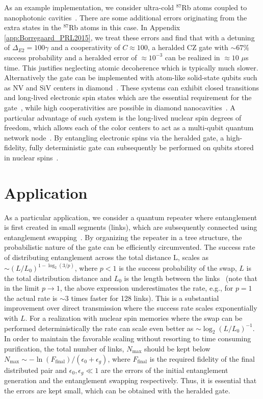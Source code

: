 As an example implementation, we consider ultra-cold ${}^{87}$Rb atoms coupled
to nanophotonic cavities~\cite{thompson,Tiecke}. There are some additional
errors originating from the extra states in the ${}^{87}$Rb atoms in this case.
In Appendix \ref{app:Borregaard_PRL2015}, we treat these errors and find that with a detuning of
$\Delta_{E2}=100\gamma$ and a cooperativity of $C\approx100$, a heralded CZ gate
with $\sim67\%$ success probability and a heralded error of $\approx 10^{-3}$
can be realized in $\approx10$ $\mu$s time. This justifies neglecting atomic
decoherence which is typically much slower.
Alternatively the gate can be implemented with atom-like solid-state qubits such
as NV and SiV centers in diamond~\cite{phystoday}. These systems can exhibit
closed transitions and long-lived electronic spin states which are the essential
requirement for the gate~\cite{togan}, while high cooperativities are possible
in  diamond nanocavities~\cite{burek}. A particular advantage of such system is
the long-lived nuclear spin degrees of freedom, which allows each of the color
centers  to act as a multi-qubit quantum network node~\cite{maurer}.   By
entangling electronic spins via the heralded gate, a high-fidelity, fully
deterministic gate can subsequently be performed on qubits stored in nuclear
spins~\cite{Anders2prl}.

\section{Application}

As a particular application, we consider a quantum repeater where entanglement
is first created in small segments (links), which are subsequently connected
using entanglement swapping~\cite{briegel}. By organizing the repeater in a tree
structure, the probabilistic nature of the gate can be efficiently circumvented.
The success rate of distributing entanglement across the total distance L,
scales as $\sim (L/L_{0})^{1-\log_{2}(3/p)}$, where $p<1$ is the success
probability of the swap, $L$ is the total distribution distance and $L_{0}$ is
the length between the links~\cite{Borregaard2015b} (note that in the limit $p\to1$,
the above expression underestimates the rate, e.g., for $p=1$ the actual rate is
$\sim3$ times faster for 128 links). This is a substantial improvement over
direct transmission where the success rate scales exponentially with $L$. For a
realization with nuclear spin memories where the swap can be performed
deterministically the rate can scale even better as
$\sim\log_{2}(L/L_{0})^{-1}$. In order to maintain the favorable scaling without
resorting to time consuming purification, the total number of links,
$N_{\text{max}}$ should be kept below
$N_{\text{max}}\sim-\ln(F_{\text{final}})/(\epsilon_{0}+\epsilon_{g})$, where
$F_{\text{final}}$ is the required fidelity of the final distributed pair and
$\epsilon_{0},\epsilon_{g}\ll1$ are the errors of the initial entanglement
generation and the entanglement swapping respectively. Thus, it is essential
that the errors are kept small, which can be obtained with the heralded gate.

